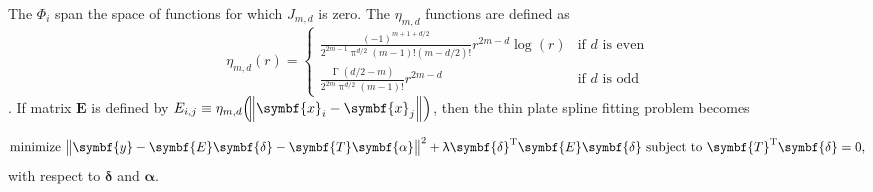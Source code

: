 The \(\Phi_i\) span the space of functions for which \(J_{m, d}\) is zero.  The \(\eta_{m, d}\) functions are defined as
\begin{equation}
  \label{eq:ThinPlateSplinesEtaFunctionDefinition}
  \eta_{m, d}(r) =
  \begin{cases}
    \frac{(-1)^{m + 1 + d / 2}}{2^{2m - 1}\uppi^{d / 2}(m - 1)!(m - d / 2)!}r^{2m - d}\log(r) & \text{if \(d\) is even} \\
    \frac{\upGamma (d / 2 - m)}{2^{2m}\uppi^{d / 2}(m - 1)!}r^{2m - d} & \text{if \(d\) is odd}
  \end{cases}
\end{equation}
\parencite{Wood2006}.  If matrix \(\symbf{E}\) is defined by \(E_{i, j} \equiv \eta_{m, d}\Bigl(\norm{\symbf{x}_i - \symbf{x}_j}\Bigr)\), then the thin plate spline fitting problem becomes

\begin{equation}
  \label{eq:ThinPlateSplineSimplifiedFittingProblem}
  \text{minimize } \norm{\symbf{y} - \symbf{E}\symbf{\delta} - \symbf{T}\symbf{\alpha}}^2 + \uplambda \symbf{\delta}^{\text{T}}\symbf{E}\symbf{\delta} \text{ subject to } \symbf{T}^{\text{T}}\symbf{\delta} = 0,
\end{equation}
with respect to \(\symbf{\delta}\) and \(\symbf{\alpha}\).

